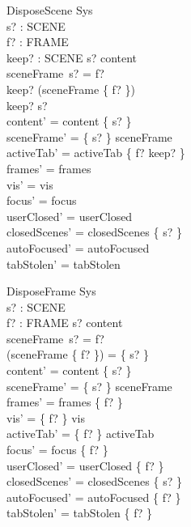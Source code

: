 \documentclass[a4paper,10pt,fleqn]{article}
\begin{document}
\begin{schema}{DisposeScene}
  \Delta Sys \\
  s? : SCENE \\
  f? : FRAME \\
  keep? : SCENE
\where
  s? \in content \\
  sceneFrame~s? = f? \\
  keep? \in \dom (sceneFrame \rres \{ f? \}) \\
  keep? \neq s? \\
  content' = content \setminus \{ s? \} \\
  sceneFrame' = \{ s? \} \ndres sceneFrame \\
  activeTab' = activeTab \oplus \{ f? \mapsto keep? \} \\
  frames' = frames \\
  vis' = vis \\
  focus' = focus \\
  userClosed' = userClosed \\
  closedScenes' = closedScenes \setminus \{ s? \} \\
  autoFocused' = autoFocused \\
  tabStolen' = tabStolen
\end{schema}

\begin{schema}{DisposeFrame}
  \Delta Sys \\
  s? : SCENE \\
  f? : FRAME
\where
  s? \in content \\
  sceneFrame~s? = f? \\
  \dom (sceneFrame \rres \{ f? \}) = \{ s? \} \\
  content' = content \setminus \{ s? \} \\
  sceneFrame' = \{ s? \} \ndres sceneFrame \\
  frames' = frames \setminus \{ f? \} \\
  vis' = \{ f? \} \ndres vis \\
  activeTab' = \{ f? \} \ndres activeTab \\
  focus' = focus \setminus \{ f? \} \\
  userClosed' = userClosed \setminus \{ f? \} \\
  closedScenes' = closedScenes \setminus \{ s? \} \\
  autoFocused' = autoFocused \setminus \{ f? \} \\
  tabStolen' = tabStolen \setminus \{ f? \}
\end{schema}
\end{document}
